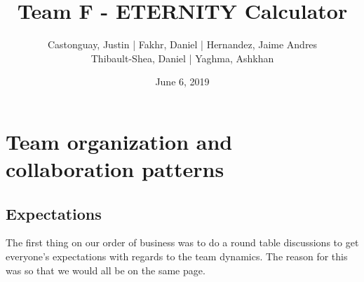 \documentclass[a4paper]{article}
\begin{document}
\title{\LARGE{\textbf{Team F - ETERNITY Calculator}}}
\author{
	Castonguay, Justin | Fakhr, Daniel | Hernandez, Jaime Andres \\ Thibault-Shea, Daniel |
	Yaghma, Ashkhan \\
}
\date{June 6, 2019}

\fancyhf{}

\clearpage\maketitle
\thispagestyle{empty} %
\pagebreak

\setcounter{page}{2} %
\fancyhf{}
\renewcommand{\headrulewidth}{2pt}
\renewcommand{\footrulewidth}{1pt}
\fancyhead[LE,RO]{\rightmark}
\tableofcontents
\pagebreak

\section{Team organization and collaboration patterns}

\subsection{Expectations}

The first thing on our order of business was to do a round table discussions to get everyone's expectations with regards to the team dynamics. The reason for this was so that we would all be on the same page.

\medskip
\end{document}
